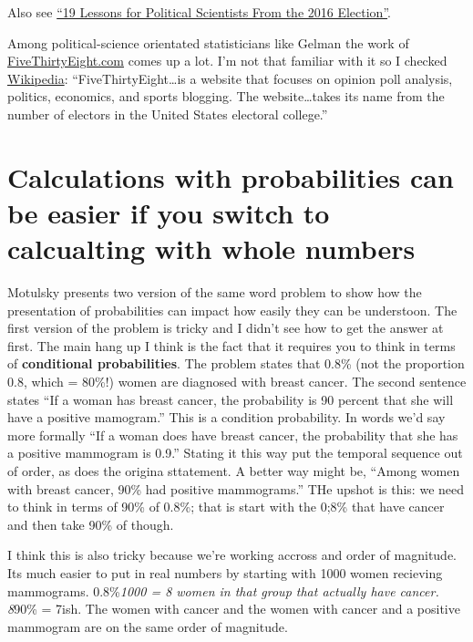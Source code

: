 \documentclass[]{book}
\theoremstyle{definition}
\theoremstyle{definition}
\theoremstyle{definition}
\theoremstyle{remark}
\begin{document}
Also see
\href{http://www.slate.com/articles/news_and_politics/politics/2016/12/_19_lessons_for_political_scientists_from_the_2016_election.html}{``19
Lessons for Political Scientists From the 2016 Election''}.

Among political-science orientated statisticians like Gelman the work of
\href{}{FiveThirtyEight.com} comes up a lot. I'm not that familiar with
it so I checked
\href{https://en.wikipedia.org/wiki/FiveThirtyEight}{Wikipedia}:
``FiveThirtyEight\ldots{}is a website that focuses on opinion poll
analysis, politics, economics, and sports blogging. The
website\ldots{}takes its name from the number of electors in the United
States electoral college.''

\section{Calculations with probabilities can be easier if you switch to
calcualting with whole
numbers}\label{calculations-with-probabilities-can-be-easier-if-you-switch-to-calcualting-with-whole-numbers}

Motulsky presents two version of the same word problem to show how the
presentation of probabilities can impact how easily they can be
understoon. The first version of the problem is tricky and I didn't see
how to get the answer at first. The main hang up I think is the fact
that it requires you to think in terms of \textbf{conditional
probabilities}. The problem states that 0.8\% (not the proportion 0.8,
which = 80\%!) women are diagnosed with breast cancer. The second
sentence states ``If a woman has breast cancer, the probability is 90
percent that she will have a positive mamogram.'' This is a condition
probability. In words we'd say more formally ``If a woman does have
breast cancer, the probability that she has a positive mammogram is
0.9.'' Stating it this way put the temporal sequence out of order, as
does the origina sttatement. A better way might be, ``Among women with
breast cancer, 90\% had positive mammograms.'' THe upshot is this: we
need to think in terms of 90\% of 0.8\%; that is start with the 0;8\%
that have cancer and then take 90\% of though.

I think this is also tricky because we're working accross and order of
magnitude. Its much easier to put in real numbers by starting with 1000
women recieving mammograms. 0.8\%\emph{1000 = 8 women in that group that
actually have cancer. 8}90\% = 7ish. The women with cancer and the women
with cancer and a positive mammogram are on the same order of magnitude.
\end{document}
